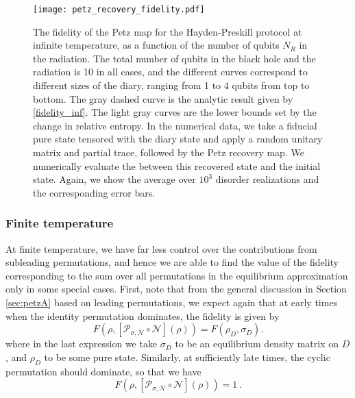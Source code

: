 \documentclass[a4paper,11pt]{article}
\newcommand{\be}{\begin{equation}}
\newcommand{\ee}{\end{equation}}
\begin{document}
\begin{enumerate}
\begin{figure}
 \centering
 \texttt{[image: petz\_recovery\_fidelity.pdf]}
 \caption{The fidelity of the Petz map for the Hayden-Preskill protocol at infinite temperature, as a function of the number of qubits $N_R$ in the radiation. The total number of qubits in the black hole and the radiation is 10 in all cases, and the different curves correspond to different sizes of the diary, ranging from 1 to 4 qubits from top to bottom. The gray dashed curve is the analytic result given by \eqref{fidelity_inf}. The light gray curves are the lower bounds set by the change in relative entropy. In the numerical data, we take a fiducial pure state tensored with the diary state and apply a random unitary matrix and partial trace, followed by the Petz recovery map. We numerically evaluate the between this recovered state and the initial state. Again, we show the average over $10^3$ disorder realizations and the corresponding error bars.}
 \label{petz_recovery_fidelity}
\end{figure}

\subsubsection{Finite temperature} 


At finite temperature, we have far less control over the contributions from subleading permutations, and hence we are able to find the value of the fidelity corresponding to the sum over all permutations in the equilibrium approximation only in some special cases. First, note that from the general discussion in Section \ref{sec:petzA} based on leading permutations, we expect again that at early times when the identity permutation dominates, the fidelity is given by 
\be 
 F(\rho , [\mathcal{P}_{\sigma,\mathcal{N}}\circ \mathcal{N}](\rho)) = F(\rho_D , \sigma_D) .
\ee
where in the last expression we take $\sigma_D$ to be an equilibrium density matrix on $D$, and $\rho_D$ to be some pure state. Similarly, at sufficiently late times, the cyclic permutation should dominate, so that we have 
\be 
 F(\rho , [\mathcal{P}_{\sigma,\mathcal{N}}\circ \mathcal{N}](\rho)) =1 \, . 
\ee 


\end{enumerate}
\end{document}
